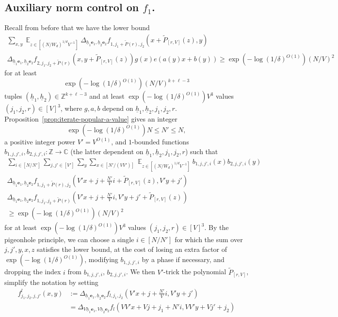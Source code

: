 \documentclass[11pt]{amsart}
\theoremstyle{definition}
\DeclareMathOperator*{\E}{\mathbb{E}}
\newcommand{\C}{{\mathbb C}}
\newcommand{\Z}{{\mathbb Z}}
\newcommand{\be}{{\mathbf{e}}}
\newcommand{\uh}{{\underline{h}}}
\begin{document}
\subsection{Auxiliary norm control on $f_1$.}\label{S: auiliary}
Recall from before that we have the lower bound
\begin{multline*}
\sum_{x,y}\E_{z \in [(N/W_d)^{1/d}V^{-1}]} \Delta_{\uh_1 \be_1,\uh_2 \be_2} f_{1,j_1+\widetilde P(r),j_2}(x+\widetilde P_{[r, V]}(z),y)\\
\Delta_{\uh_1 \be_1,\uh_2 \be_2} f_{2,j_1, j_2+\widetilde P(r)}(x,y+\widetilde P_{[r, V]}(z)) 
g(x)e(a(y)x+b(y))\geq \exp(-\log(1/\delta)^{O(1)}) (N/V)^2 
\end{multline*}
for at least $$\exp(-\log(1/\delta)^{O(1)})(N/V)^{k+\ell-3}$$ tuples $(\uh_1, \uh_2)\in\Z^{k+\ell-3}$ and at least $\exp(-\log(1/\delta)^{O(1)})V^3$ values $(j_1, j_2, r) \in [V]^3$, where $g,a,b$ depend on $\uh_1, \uh_2, j_1,j_2, r$.
Proposition~\ref{prop:iterate-popular-a-value} gives an integer $$\exp(-\log(1/\delta)^{O(1)})N\leq N'\leq N,$$ a positive integer power $V'=V^{O(1)}$, and $1$-bounded functions $b_{1,j,j',i}, b_{2,j,j',i}:\Z\to\C$ (the latter dependent on $\uh_1, \uh_2, j_1,j_2, r$) such that
\begin{multline*}
    \sum_{i\in [N/N']}\sum_{j,j'\in[V']}\sum_y\sum_{x\in [N'/(VV')]} \E_{z \in [(N/W_d)^{1/d}V^{-1}]} b_{1,j,j',i}(x)b_{2,j,j',i}(y)\\ 
     \Delta_{\uh_1 \be_1,\uh_2 \be_2}f_{1, j_1 + \widetilde P(r), j_2}(V'x + j + \frac{N'}{V}i+\widetilde P_{[r, V]}(z),V'y+j')\\
     \Delta_{\uh_1 \be_1,\uh_2 \be_2}f_{1, j_1, j_2 + \widetilde P(r)}(V'x + j + \frac{N'}{V}i,V'y+j'+\widetilde P_{[r, V]}(z))\\
     \geq \exp(-\log(1/\delta)^{O(1)})(N/V)^2
\end{multline*}
for at least $\exp(-\log(1/\delta)^{O(1)}) V^3$ values $(j_1, j_2, r) \in [V]^3$. By the pigeonhole principle, we can choose a single $i\in[N/N']$ for which the sum over $j,j',y,x,z$ satisfies the lower bound, at the cost of losing an extra factor of $\exp(-\log(1/\delta)^{O(1)})$, modifying $b_{1,j,j',i}$ by a phase if necessary, and dropping the index $i$ from $b_{1,j,j',i}$, $b_{2,j,j',i}$. We then $V'$-trick the polynomial $\widetilde P_{[r,V]}$, simplify the notation by setting
\begin{equation}\label{E: f^l}
\begin{split}
    f^l_{j_1, j_2, j, j'}(x,y) &:= \Delta_{\uh_1 \be_1,\uh_2 \be_2}f_{l, j_1, j_2}(V'x + j + \frac{N'}{V}i,V'y+j')\\
    &=\Delta_{V\uh_1 \be_1,V\uh_2 \be_2}f_l(VV'x + Vj + j_1+ N'i,VV'y+ Vj'+j_2)
\end{split}
\end{equation}
\end{document}

